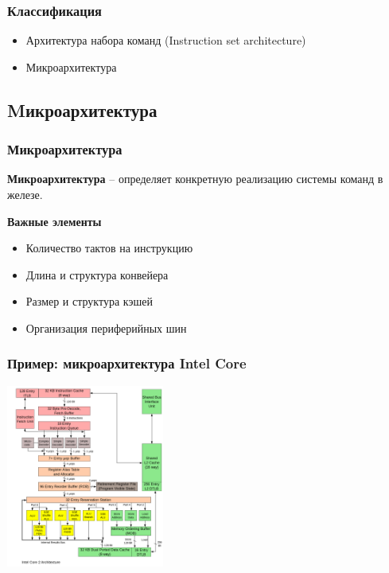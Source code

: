 
\begin{frame}
 \frametitle{Классификация}
 \begin{itemize}
   \item Архитектура набора команд (Instruction set architecture)
   \item Микроархитектура
 \end{itemize}
\end{frame}
\subsection{Mикроархитектура}
\begin{frame}
 \frametitle{Микроархитектура}
 \textbf{Микроархитектура} -- определяет конкретную реализацию системы команд в железе. 

 \textbf{Важные элементы}
 \begin{itemize}
  \item Количество тактов на инструкцию
  \item Длина и структура конвейера
  \item Размер и структура кэшей
  \item Организация периферийных шин
 \end{itemize}
\end{frame}

\begin{frame}
  \frametitle{Пример: микроархитектура Intel Core}
  \includegraphics[height=6cm]{slides/processor_arch/Intel_Core2_arch.png}
\end{frame}
